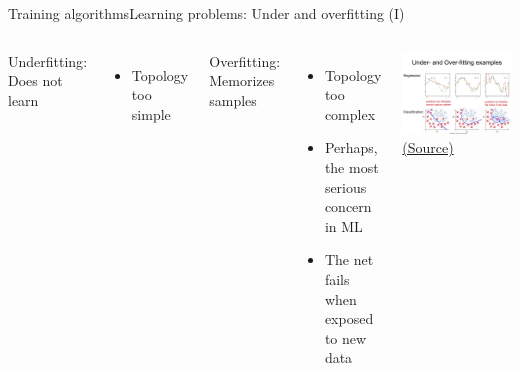 \documentclass[10pt,compress]{beamer} %
\begin{document}
\begin{frame}{Training algorithms}{Learning problems: Under and overfitting (I)}
    \begin{columns}
		\alert{Underfitting}: Does not learn
            \begin{itemize}
                \item Topology too simple
            \end{itemize}

		\alert{Overfitting}: Memorizes samples
            \begin{itemize}
                \item Topology too complex
                \item Perhaps, the most serious concern in ML
                \item The net fails when exposed to new data
            \end{itemize}

            \begin{center}
			\includegraphics[width=\linewidth]{figs/fitting.jpg}\\
			\scriptsize \href{https://www.youtube.com/watch?v=dBLZg-RqoLg}{(Source)}
            \end{center}
   \end{columns}
\end{frame}
\end{document}
